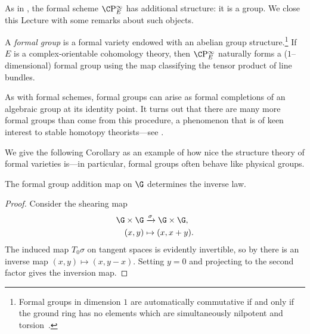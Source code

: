 As in , the formal scheme \(\CP^\infty_E\) has additional structure: it is a group.  We close this Lecture with some remarks about such objects.

\begin{definition}\label{DefnFormalGps}
A \textit{formal group} is a formal variety endowed with an abelian group structure.\footnote{Formal groups in dimension \(1\) are automatically commutative if and only if the ground ring has no elements which are simultaneously nilpotent and torsion~\cite[Theorem I.6.1]{Hazewinkel}.}  If \(E\) is a complex-orientable cohomology theory, then \(\CP^\infty_E\) naturally forms a (\(1\)--dimensional) formal group using the map classifying the tensor product of line bundles.
\end{definition}

\begin{remark}
As with formal schemes, formal groups can arise as formal completions of an algebraic group at its identity point.  It turns out that there are many more formal groups than come from this procedure, a phenomenon that is of keen interest to stable homotopy theorists---see .
\end{remark}

We give the following Corollary as an example of how nice the structure theory of formal varieties is---in particular, formal groups often behave like physical groups.

\begin{corollary}
The formal group addition map on \(\G\) determines the inverse law.
\end{corollary}
\begin{proof}
Consider the shearing map
\begin{align*}
\G \times \G & \xrightarrow{\sigma} \G \times \G, \\
(x, y) & \mapsto (x, x + y).
\end{align*}
The induced map \(T_0 \sigma\) on tangent spaces is evidently invertible, so by  there is an inverse map \((x, y) \mapsto (x, y - x)\).  Setting \(y = 0\) and projecting to the second factor gives the inversion map.
\end{proof}



